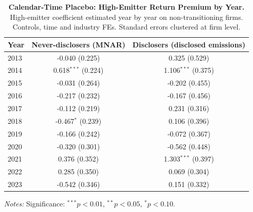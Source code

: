 \documentclass[a4paper,12pt]{article}
\begin{document}
\begin{table}[htbp]
\footnotesize\centering
\caption{\textbf{Calendar-Time Placebo: High-Emitter Return Premium by Year.}
High-emitter coefficient estimated year by year on non-transitioning firms.
Controls, time and industry FEs. Standard errors clustered at firm level.}
\label{tab:returns_calendar_placebo}
\begin{tabular}{lcc}
\toprule
Year & Never-disclosers (MNAR) & Disclosers (disclosed emissions) \\
\midrule
2013 & -0.040 (0.225) & 0.325 (0.529) \\
2014 & 0.618$^{***}$ (0.224) & 1.106$^{***}$ (0.375) \\
2015 & -0.031 (0.264) & -0.202 (0.455) \\
2016 & -0.217 (0.232) & -0.167 (0.456) \\
2017 & -0.112 (0.219) & 0.231 (0.316) \\
2018 & -0.467$^{*}$ (0.239) & 0.106 (0.396) \\
2019 & -0.166 (0.242) & -0.072 (0.367) \\
2020 & -0.320 (0.301) & -0.562 (0.448) \\
2021 & 0.376 (0.352) & 1.303$^{***}$ (0.397) \\
2022 & 0.285 (0.350) & 0.069 (0.304) \\
2023 & -0.542 (0.346) & 0.151 (0.332) \\
\bottomrule
\end{tabular}
\begin{flushleft}\footnotesize
\textit{Notes:} Significance: $^{***}p<0.01$, $^{**}p<0.05$, $^{*}p<0.10$.
\end{flushleft}
\end{table}
\end{document}
